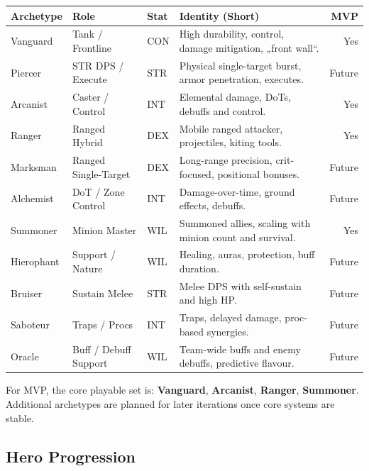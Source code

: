 	\begin{tabular}{lllp{5.5cm}r}
		\textbf{Archetype} & \textbf{Role} & \textbf{Stat} & \textbf{Identity (Short)} & \textbf{MVP} \\
		\hline
		Vanguard & Tank / Frontline & CON & High durability, control, damage mitigation, „front wall“. & Yes \\
		Piercer & STR DPS / Execute & STR & Physical single-target burst, armor penetration, executes. & Future \\
		Arcanist & Caster / Control & INT & Elemental damage, DoTs, debuffs and control. & Yes \\
		Ranger & Ranged Hybrid & DEX & Mobile ranged attacker, projectiles, kiting tools. & Yes \\
		Marksman & Ranged Single-Target & DEX & Long-range precision, crit-focused, positional bonuses. & Future \\
		Alchemist & DoT / Zone Control & INT & Damage-over-time, ground effects, debuffs. & Future \\
		Summoner & Minion Master & WIL & Summoned allies, scaling with minion count and survival. & Yes \\
		Hierophant & Support / Nature & WIL & Healing, auras, protection, buff duration. & Future \\
		Bruiser & Sustain Melee & STR & Melee DPS with self-sustain and high HP. & Future \\
		Saboteur & Traps / Procs & INT & Traps, delayed damage, proc-based synergies. & Future \\
		Oracle & Buff / Debuff Support & WIL & Team-wide buffs and enemy debuffs, predictive flavour. & Future \\
	\end{tabular}

For MVP, the core playable set is: \textbf{Vanguard}, \textbf{Arcanist}, \textbf{Ranger}, \textbf{Summoner}. 
Additional archetypes are planned for later iterations once core systems are stable.

\subsection{Hero Progression}

